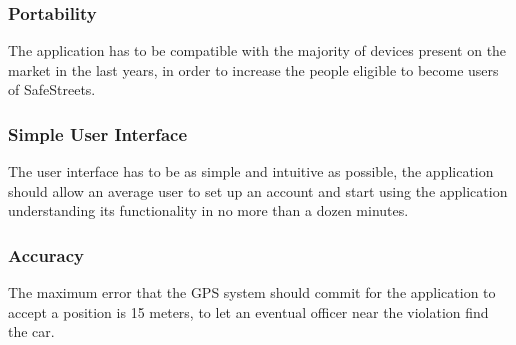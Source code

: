 \subsubsection{Portability}
	The application has to be compatible with the majority of devices present on the market in the last years, in order to
	increase the people eligible to become users of SafeStreets.
	
\subsubsection{Simple User Interface}
	The user interface has to be as simple and
	intuitive as possible, the application should allow an average user to set up
	an account and start using the application understanding its functionality
	in no more than a dozen minutes.
	
\subsubsection{Accuracy}
    The maximum error that the GPS system should commit for the application to accept a position is 15 meters,
    to let an eventual officer near the violation find the car.
